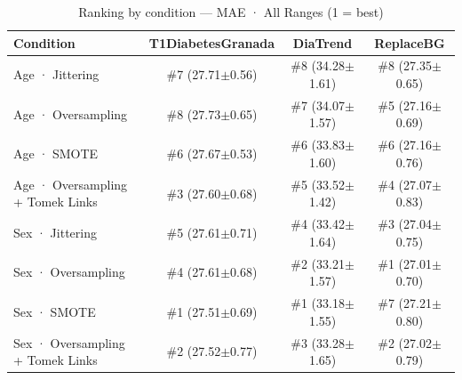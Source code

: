 \begin{table}[htbp]
\centering
\small
\caption{Ranking by condition — MAE · All Ranges  (1 = best)}
\label{tab:ranking_mae_entire_family_size_oversampling}
\begin{tabular}{lccc}
\toprule
\textbf{Condition} & \textbf{T1DiabetesGranada} & \textbf{DiaTrend} & \textbf{ReplaceBG} \\
\midrule
Age · Jittering & \#7 (27.71$\pm$0.56) & \#8 (34.28$\pm$1.61) & \#8 (27.35$\pm$0.65) \\
Age · Oversampling & \#8 (27.73$\pm$0.65) & \#7 (34.07$\pm$1.57) & \#5 (27.16$\pm$0.69) \\
Age · SMOTE & \#6 (27.67$\pm$0.53) & \#6 (33.83$\pm$1.60) & \#6 (27.16$\pm$0.76) \\
Age · Oversampling + Tomek Links & \#3 (27.60$\pm$0.68) & \#5 (33.52$\pm$1.42) & \#4 (27.07$\pm$0.83) \\
\midrule
Sex · Jittering & \#5 (27.61$\pm$0.71) & \#4 (33.42$\pm$1.64) & \#3 (27.04$\pm$0.75) \\
Sex · Oversampling & \#4 (27.61$\pm$0.68) & \#2 (33.21$\pm$1.57) & \#1 (27.01$\pm$0.70) \\
Sex · SMOTE & \#1 (27.51$\pm$0.69) & \#1 (33.18$\pm$1.55) & \#7 (27.21$\pm$0.80) \\
Sex · Oversampling + Tomek Links & \#2 (27.52$\pm$0.77) & \#3 (33.28$\pm$1.65) & \#2 (27.02$\pm$0.79) \\
\bottomrule
\end{tabular}
\end{table}